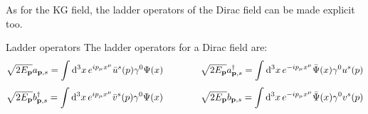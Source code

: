 As for the KG field, the ladder operators of the Dirac field can be made explicit too.

\begin{proposition}{Ladder operators}{}
  The ladder operators for a Dirac field are:
  \begin{equation}
    \sqrt{2E_{\mathbf{p}}} a_{\mathbf{p},s} = \int \mathrm{d}^3x\, e^{i p_\mu x^\mu} \bar{u}^s(p) \gamma^0 \Psi(x)
    \qquad \qquad
    \sqrt{2E_{\mathbf{p}}} a_{\mathbf{p},s}^\dagger = \int \mathrm{d}^3x\, e^{-i p_\mu x^\mu} \bar{\Psi}(x) \gamma^0 u^s(p)
    \label{eq:dirac-ladd-op-a}
  \end{equation}
  \begin{equation}
    \sqrt{2E_{\mathbf{p}}} b_{\mathbf{p},s}^\dagger = \int \mathrm{d}^3x\, e^{i p_\mu x^\mu} \bar{v}^s(p) \gamma^0 \Psi(x)
    \qquad \qquad
    \sqrt{2E_{\mathbf{p}}} b_{\mathbf{p},s} = \int \mathrm{d}^3x\, e^{-i p_\mu x^\mu} \bar{\Psi}(x) \gamma^0 v^s(p)
    \label{eq:dirac-ladd-op-b}
  \end{equation}
\end{proposition}

